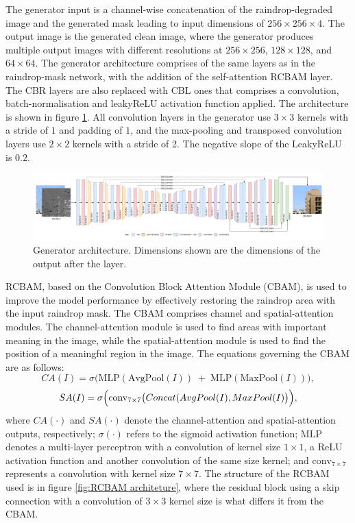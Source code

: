 \documentclass[11pt]{ociamthesis}  %
\begin{document}
The generator input is a channel-wise concatenation of the raindrop-degraded image and the generated mask leading to input dimensions of $256 \times 256 \times 4$. The output image is the generated clean image, where the generator produces multiple output images with different resolutions at $256 \times 256$, $128 \times 128$, and $64 \times 64$. The generator architecture comprises of the same layers as in the raindrop-mask network, with the addition of the self-attention RCBAM layer. The CBR layers are also replaced with CBL ones that comprises a convolution, batch-normalisation and leakyReLU activation function applied. The architecture is shown in figure \ref{fig:Generator architeture}. All convolution layers in the generator use $3 \times 3$ kernels with a stride of $1$ and padding of $1$, and the max-pooling and transposed convolution layers use $2 \times 2$ kernels with a stride of 2. The negative slope of the LeakyReLU is $0.2$.

\begin{figure}
    \centering
    \includegraphics[width=0.9\linewidth]{figures/Kwon-et-al-Generator-Architecture.png}
    \caption{Generator architecture. Dimensions shown are the dimensions of the output after the layer.}
    \label{fig:Generator architeture}
\end{figure}

RCBAM, based on the Convolution Block Attention Module (CBAM)\cite{woo2018cbam}, is used to improve the model performance by effectively restoring the raindrop area with the input raindrop mask. The CBAM comprises channel and spatial-attention modules. The channel-attention module is used to find areas with important meaning in the image, while the spatial-attention module is used to find the position of a meaningful region in the image. The equations governing the CBAM are as follows:
\noindent
\begin{equation}
CA(I) = \sigma \bigl(
   \mathrm{MLP}(\mathrm{AvgPool}(I))
   \;+\;
   \mathrm{MLP}(\mathrm{MaxPool}(I))
\bigr),
\end{equation}
\noindent
\begin{equation}
SA(I) = \sigma \Bigl(
   \mathrm{conv}_{7\times7}\bigl(
     Concat(AvgPool(I),MaxPool(I)
   \bigr)
\Bigr),
\end{equation}
\noindent where $CA(\cdot)$ and \noindent $SA(\cdot)$ denote the channel-attention and spatial-attention outputs, respectively; $\sigma(\cdot)$ refers to the sigmoid activation function; $\mathrm{MLP}$ denotes a multi-layer perceptron with a convolution of kernel size $1 \times 1$, a ReLU activation function and another convolution of the same size kernel; and $\mathrm{conv}_{7 \times 7}$ represents a convolution with kernel size $7 \times 7$. The structure of the RCBAM used is in figure \ref{fig:RCBAM architeture}, where the residual block using a skip connection with a convolution of $3 \times 3$ kernel size is what differs it from the CBAM.
\end{document}
